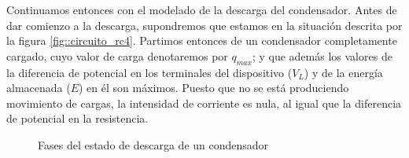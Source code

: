 \documentclass[../main.tex]{subfiles}
\begin{document}
Continuamos entonces con el modelado de la descarga del condensador. Antes de dar comienzo a la descarga, supondremos que estamos en la situación descrita por la figura \ref{fig::circuito_rc4}. Partimos entonces de un condensador completamente cargado, cuyo valor de carga denotaremos por $q_{max}$; y que además los valores de la diferencia de potencial en los terminales del dispositivo ($V_L$) y de la energía almacenada ($E$) en él son máximos. Puesto que no se está produciendo movimiento de cargas, la intensidad de corriente es nula, al igual que la diferencia de potencial en la resistencia. \\

\begin{figure}[!h]
    \centering
    \caption{Fases del estado de descarga de un condensador}
    \label{fig::descarga_condensador}
\end{figure}
\end{document}
